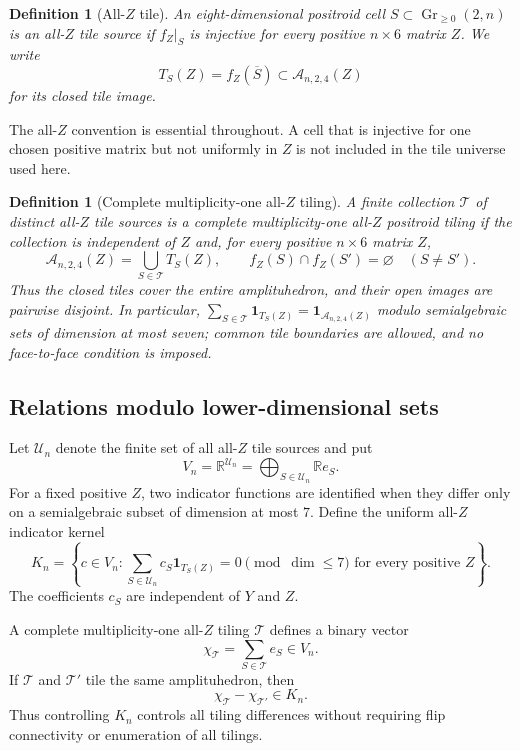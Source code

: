 \documentclass[11pt]{article}
\newtheorem{definition}[theorem]{Definition}
\newcommand{\Gr}{\operatorname{Gr}}
\newcommand{\A}{\mathcal A}
\newcommand{\U}{\mathcal U}
\newcommand{\R}{\mathbb R}
\newcommand{\1}{\mathbf 1}
\newcommand{\ind}{\mathbf 1}
\begin{document}
\begin{definition}[All-$Z$ tile]
An eight-dimensional positroid cell $S\subset\Gr_{\ge0}(2,n)$ is an
\emph{all-$Z$ tile source} if $f_Z|_S$ is injective for every positive
$n\times6$ matrix $Z$.  We write
\[
T_S(Z)=f_Z(\overline S)\subset\A_{n,2,4}(Z)
\]
for its closed tile image.
\end{definition}

The all-$Z$ convention is essential throughout.  A cell that is injective
for one chosen positive matrix but not uniformly in $Z$ is not included in
the tile universe used here.

\begin{definition}[Complete multiplicity-one all-$Z$ tiling]
A finite collection $\mathcal T$ of distinct all-$Z$ tile sources is a
\emph{complete multiplicity-one all-$Z$ positroid tiling} if the collection
is independent of $Z$ and, for every positive $n\times6$ matrix $Z$,
\[
\A_{n,2,4}(Z)=\bigcup_{S\in\mathcal T}T_S(Z),
\qquad
f_Z(S)\cap f_Z(S')=\varnothing\quad(S\ne S').
\]
Thus the closed tiles cover the entire amplituhedron, and their open
images are pairwise disjoint.  In particular,
$\sum_{S\in\mathcal T}\ind_{T_S(Z)}=\ind_{\A_{n,2,4}(Z)}$
modulo semialgebraic sets of dimension at most seven; common tile
boundaries are allowed, and no face-to-face condition is imposed.
\end{definition}

\subsection{Relations modulo lower-dimensional sets}
Let $\U_n$ denote the finite set of all all-$Z$ tile sources and put
\[
V_n=\R^{\U_n}=\bigoplus_{S\in\U_n}\R e_S.
\]
For a fixed positive $Z$, two indicator functions are identified when they
differ only on a semialgebraic subset of dimension at most $7$.  Define the
uniform all-$Z$ indicator kernel
\begin{equation}\label{eq:Kn}
K_n=\left\{c\in V_n:
\sum_{S\in\U_n}c_S\ind_{T_S(Z)}=0
\pmod{\dim\le7}
\text{ for every positive }Z\right\}.
\end{equation}
The coefficients $c_S$ are independent of $Y$ and $Z$.

A complete multiplicity-one all-$Z$ tiling $\mathcal T$ defines a binary
vector
\[
\chi_{\mathcal T}=\sum_{S\in\mathcal T}e_S\in V_n.
\]
If $\mathcal T$ and $\mathcal T'$ tile the same amplituhedron, then
\begin{equation}\label{eq:tilingdifference}
\chi_{\mathcal T}-\chi_{\mathcal T'}\in K_n.
\end{equation}
Thus controlling $K_n$ controls all tiling differences without requiring
flip connectivity or enumeration of all tilings.
\end{document}
